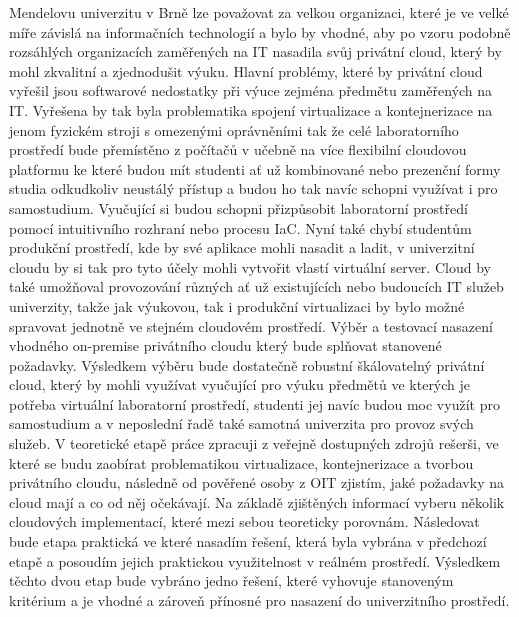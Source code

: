 \documentclass[twoside, 12pt]{article}
\begin{document}
\obsah
\listoffigures
\listoftables
{}
Mendelovu univerzitu v Brně lze považovat za velkou organizaci, které je ve velké míře závislá na informačních technologií a bylo by vhodné, aby po vzoru podobně rozsáhlých organizacích zaměřených na IT nasadila svůj privátní cloud, který by mohl zkvalitní a zjednodušit výuku. Hlavní problémy, které by privátní cloud vyřešil jsou softwarové nedostatky při výuce zejména předmětu zaměřených na IT. Vyřešena by tak byla problematika spojení virtualizace a kontejnerizace na jenom fyzickém stroji s omezenými oprávněními tak že celé laboratorního prostředí bude přemístěno z počítačů v učebně na více flexibilní cloudovou platformu ke které budou mít studenti ať už kombinované nebo prezenční formy studia odkudkoliv neustálý přístup a budou ho tak navíc schopni využívat i pro samostudium. Vyučující si budou schopni přizpůsobit laboratorní prostředí pomocí intuitivního rozhraní nebo procesu IaC. Nyní také chybí studentům produkční prostředí, kde by své aplikace mohli nasadit a ladit, v univerzitní cloudu by si tak pro tyto účely mohli vytvořit vlastí virtuální server. Cloud by také umožňoval provozování různých ať už existujících nebo budoucích IT služeb univerzity, takže jak výukovou, tak i produkční virtualizaci by bylo možné spravovat jednotně ve stejném cloudovém prostředí.
Výběr a testovací nasazení vhodného on-premise privátního cloudu  který bude splňovat stanovené požadavky. Výsledkem výběru bude dostatečně robustní škálovatelný privátní cloud, který by mohli využívat vyučující pro výuku předmětů ve kterých je potřeba virtuální laboratorní prostředí, studenti jej navíc budou moc využít pro samostudium a v neposlední řadě také samotná univerzita pro provoz svých služeb.
V teoretické etapě práce zpracuji z veřejně dostupných zdrojů rešerši, ve které se budu zaobírat problematikou virtualizace, kontejnerizace a tvorbou privátního cloudu, následně od pověřené osoby z OIT zjistím, jaké požadavky na cloud mají a co od něj očekávají. Na základě zjištěných informací vyberu několik cloudových implementací, které mezi sebou teoreticky porovnám. Následovat bude etapa praktická ve které nasadím řešení, která byla vybrána v předchozí etapě a posoudím jejich praktickou využitelnost v reálném prostředí. Výsledkem těchto dvou etap bude vybráno jedno řešení, které vyhovuje stanoveným kritérium a je vhodné a zároveň přínosné pro nasazení do univerzitního prostředí.
\end{document}
